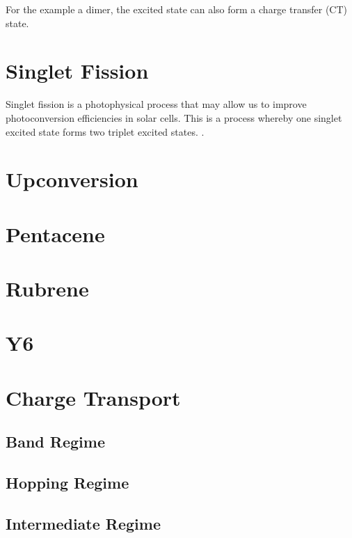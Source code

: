 
For the example a dimer, the excited state can also form a charge transfer (CT) state.



\section{Singlet Fission}

Singlet fission is a photophysical process that may allow us to improve photoconversion efficiencies in solar cells. This is a process whereby one singlet excited state forms two triplet excited states. \cite{smith2010singlet}.


\section{Upconversion}


\section{Pentacene}

\section{Rubrene}

\section{Y6}

\section{Charge Transport}

\cite{oberhofer2017charge}


\subsection{Band Regime}

\subsection{Hopping Regime}

\subsection{Intermediate Regime}